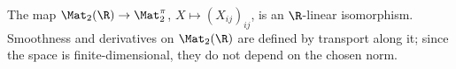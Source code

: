 The map $\Mat_2(\R)\to\Mat_2^{\pi}$, $X\mapsto(X_{ij})_{ij}$, is an $\R$-linear isomorphism. Smoothness and derivatives on $\Mat_2(\R)$ are defined by transport along it; since the space is finite-dimensional, they do not depend on the chosen norm.
